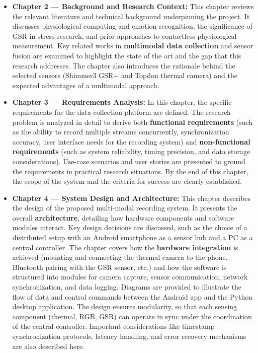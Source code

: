 \begin{itemize}
\item \textbf{Chapter 2 --- Background and Research Context:} This chapter reviews
  the relevant literature and technical background underpinning the
  project. It discusses physiological computing and emotion recognition,
  the significance of GSR in stress research, and prior approaches to
  contactless physiological measurement. Key related works in
  \textbf{multimodal data collection} and sensor fusion are examined to
  highlight the state of the art and the gap that this research
  addresses. The chapter also introduces the rationale behind the
  selected sensors (Shimmer3 GSR+ and Topdon thermal camera) and the
  expected advantages of a multimodal approach.

\item \textbf{Chapter 3 --- Requirements Analysis:} In this chapter, the specific
  requirements for the data collection platform are defined. The
  research problem is analyzed in detail to derive both \textbf{functional
  requirements} (such as the ability to record multiple streams
  concurrently, synchronization accuracy, user interface needs for the
  recording system) and \textbf{non-functional requirements} (such as system
  reliability, timing precision, and data storage considerations).
  Use-case scenarios and user stories are presented to ground the
  requirements in practical research situations. By the end of this
  chapter, the scope of the system and the criteria for success are
  clearly established.

\item \textbf{Chapter 4 --- System Design and Architecture:} This chapter
  describes the design of the proposed multi-modal recording system. It
  presents the overall \textbf{architecture}, detailing how hardware
  components and software modules interact. Key design decisions are
  discussed, such as the choice of a distributed setup with an Android
  smartphone as a sensor hub and a PC as a central
  controller\cite{SimulatorValidityPhysiological2025}.
  The chapter covers how the \textbf{hardware integration} is achieved
  (mounting and connecting the thermal camera to the phone, Bluetooth
  pairing with the GSR sensor, etc.) and how the software is structured
  into modules for camera capture, sensor communication, network
  synchronization, and data logging. Diagrams are provided to illustrate
  the flow of data and control commands between the Android app and the
  Python desktop application. The design ensures modularity, so that
  each sensing component (thermal, RGB, GSR) can operate in sync under
  the coordination of the central controller. Important considerations
  like timestamp synchronization protocols, latency handling, and error
  recovery mechanisms are also described here.


\end{itemize}
